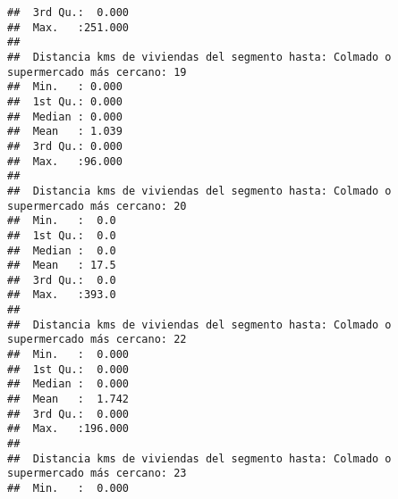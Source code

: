 \documentclass[11pt,]{article}
\begin{document}
\begin{verbatim}
##  3rd Qu.:  0.000                                                                      
##  Max.   :251.000                                                                      
##                                                                                       
##  Distancia kms de viviendas del segmento hasta: Colmado o supermercado más cercano: 19
##  Min.   : 0.000                                                                       
##  1st Qu.: 0.000                                                                       
##  Median : 0.000                                                                       
##  Mean   : 1.039                                                                       
##  3rd Qu.: 0.000                                                                       
##  Max.   :96.000                                                                       
##                                                                                       
##  Distancia kms de viviendas del segmento hasta: Colmado o supermercado más cercano: 20
##  Min.   :  0.0                                                                        
##  1st Qu.:  0.0                                                                        
##  Median :  0.0                                                                        
##  Mean   : 17.5                                                                        
##  3rd Qu.:  0.0                                                                        
##  Max.   :393.0                                                                        
##                                                                                       
##  Distancia kms de viviendas del segmento hasta: Colmado o supermercado más cercano: 22
##  Min.   :  0.000                                                                      
##  1st Qu.:  0.000                                                                      
##  Median :  0.000                                                                      
##  Mean   :  1.742                                                                      
##  3rd Qu.:  0.000                                                                      
##  Max.   :196.000                                                                      
##                                                                                       
##  Distancia kms de viviendas del segmento hasta: Colmado o supermercado más cercano: 23
##  Min.   :  0.000                                                                      

\end{verbatim}
\end{document}
